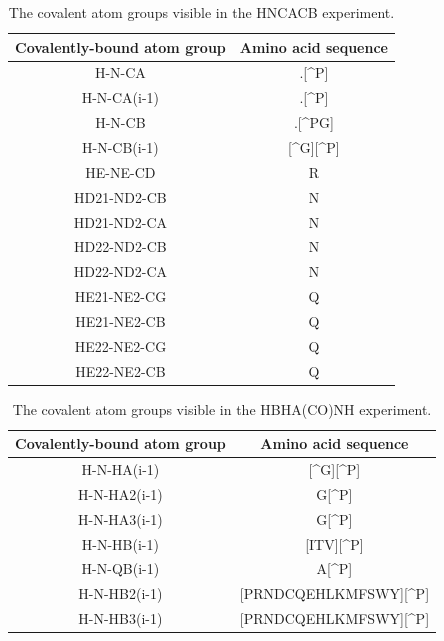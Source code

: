 \begin{table}
  \begin{tabular}{ | c | c | }
    \hline
    Covalently-bound atom group  &  Amino acid sequence  \\  \hline
    H-N-CA                       &  .[\^{}P]             \\  \hline
    H-N-CA(i-1)                  &  .[\^{}P]             \\  \hline
    H-N-CB                       &  .[\^{}PG]            \\  \hline
    H-N-CB(i-1)                  &  [\^{}G][\^{}P]       \\  \hline
    HE-NE-CD                     &  R                    \\  \hline
    HD21-ND2-CB                  &  N                    \\  \hline
    HD21-ND2-CA                  &  N                    \\  \hline
    HD22-ND2-CB                  &  N                    \\  \hline
    HD22-ND2-CA                  &  N                    \\  \hline
    HE21-NE2-CG                  &  Q                    \\  \hline
    HE21-NE2-CB                  &  Q                    \\  \hline
    HE22-NE2-CG                  &  Q                    \\  \hline
    HE22-NE2-CB                  &  Q                    \\  \hline
  \end{tabular}
  \caption{The covalent atom groups visible in the HNCACB experiment.}
  \label{hncacb_peaktypes}
\end{table}

\begin{table}
  \begin{tabular}{ | c | c | }
    \hline
    Covalently-bound atom group  &  Amino acid sequence         \\  \hline
    H-N-HA(i-1)                  &  [\^{}G][\^{}P]              \\  \hline
    H-N-HA2(i-1)                 &  G[\^{}P]                    \\  \hline
    H-N-HA3(i-1)                 &  G[\^{}P]                    \\  \hline
    H-N-HB(i-1)                  &  [ITV][\^{}P]                \\  \hline
    H-N-QB(i-1)                  &  A[\^{}P]                    \\  \hline
    H-N-HB2(i-1)                 &  [PRNDCQEHLKMFSWY][\^{}P]    \\  \hline
    H-N-HB3(i-1)                 &  [PRNDCQEHLKMFSWY][\^{}P]    \\  \hline
  \end{tabular}
  \caption{The covalent atom groups visible in the HBHA(CO)NH experiment.}
  \label{hbhaconh_peaktypes}
\end{table}

